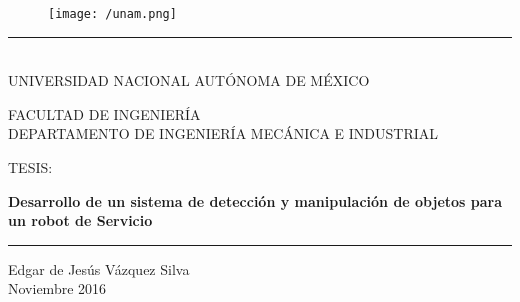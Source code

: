 \documentclass[a4paper, openright, 12pt]{report}
\begin{document}
\begin{titlepage}

	\begin{center}
		\vspace*{-1in}
		\begin{figure}[htb]
			\begin{center}
			\texttt{[image: /unam.png]}
			\end{center}
		\end{figure}
		\vspace*{0.35in}

		\begin{large}
			\rule{130mm}{0.1mm}\\
			UNIVERSIDAD NACIONAL AUTÓNOMA DE MÉXICO
		\end{large}
		\vspace*{0.55in}

		FACULTAD DE INGENIERÍA \\
		\vspace*{0.25in}
		DEPARTAMENTO DE INGENIERÍA MECÁNICA E INDUSTRIAL\\
		\vspace*{0.6in}
		\begin{large}
			TESIS:\\
		\end{large}
		\vspace*{0.2in}

		\begin{Large}
			\textbf{ Desarrollo de un sistema de detección y manipulación de objetos para un robot de Servicio} \\
		\end{Large}
		\vspace*{0.65in}

		\rule{110mm}{0.1mm}

		\vspace*{0.35in}
		\begin{large}
			Edgar de Jesús Vázquez Silva \\
			\vspace*{0.25in}
			Noviembre 2016\\
		\end{large}


	\end{center}

\end{titlepage}





\tableofcontents{}
\end{document}
